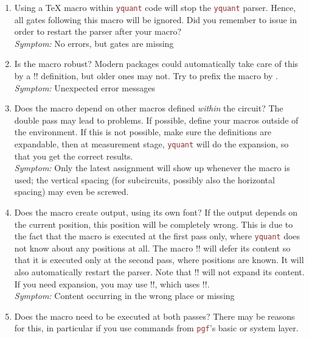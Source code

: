 \documentclass{scrartcl}
\def\pkg#1{\textcolor{brown}{\texttt{#1}}}
\def\texlink{\link\tex}
\def\Yquant{\pkg{yquant}}
\begin{document}
      \begin{enumerate}
         \item Using a \TeX{} macro within \Yquant{} code will stop the \Yquant{} parser.
            Hence, all gates following this macro will be ignored.
            Did you remember to issue \texlink{\yquant} in order to restart the parser after your macro? \\
            \emph{Symptom:} No errors, but gates are missing
         \item Is the macro robust?
            Modern packages could automatically take care of this by a \tex!\protected! definition, but older ones may not.
            Try to prefix the macro by \texlink\protect. \\
            \emph{Symptom:} Unexpected error messages
         \item Does the macro depend on other macros defined \emph{within} the circuit?
            The double pass may lead to problems.
            If possible, define your macros outside of the \texlink{yquant} environment.
            If this is not possible, make sure the definitions are expandable, then at measurement stage, \Yquant{} will do the expansion, so that you get the correct results. \\
            \emph{Symptom:} Only the latest assignment will show up whenever the macro is used; the vertical spacing (for subcircuits, possibly also the horizontal spacing) may even be screwed.
         \item Does the macro create output, using its own font?
            If the output depends on the current position, this position will be completely wrong.
            This is due to the fact that the macro is executed at the first pass only, where \Yquant{} does not know about any positions at all.
            \linkdef\yquantsecondpass\linkdef\yquantesecondpass
            The macro \tex!\yquantsecondpass! will defer its content so that it is executed only at the second pass, where positions are known.
            It will also automatically restart the parser.
            Note that \tex!\yquantsecondpass! will not expand its content.
            If you need expansion, you may use \tex!\yquantesecondpass!, which uses \tex!\protected@edef!. \\
            \emph{Symptom:} Content occurring in the wrong place or missing
         \item Does the macro need to be executed at both passes?
            There may be reasons for this, in particular if you use commands from \pkg{pgf}'s basic or system layer.

\end{enumerate}
\end{document}

